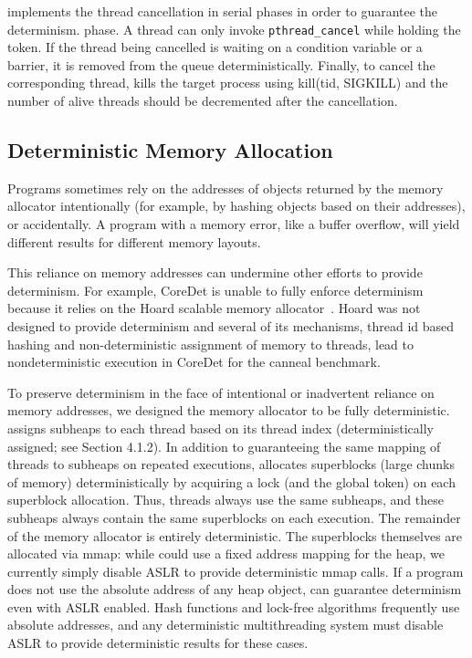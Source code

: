 \dthreads{} implements the thread cancellation in serial phases in order to guarantee the determinism. phase. A thread can only invoke \texttt{pthread\_cancel} while holding the token. If the thread being cancelled is waiting on a condition variable or a barrier, it is removed from the queue deterministically. Finally, to cancel the corresponding thread, \dthreads{} kills the target process using kill(tid, SIGKILL) and the number of alive threads should be decremented after the cancellation.

\subsection{Deterministic Memory Allocation}
Programs sometimes rely on the addresses of objects returned by the memory allocator intentionally (for example, by hashing objects based on their addresses), or accidentally. A program with a memory error, like a buffer overflow, will yield different results for different memory layouts.

This reliance on memory addresses can undermine other efforts to provide determinism. For example, CoreDet is unable to fully enforce determinism because it relies on the Hoard scalable memory allocator~\cite{Bergan:2010:CCR:1736020.1736029}. Hoard was not designed to provide determinism and several of its mechanisms, thread id based hashing and non-deterministic assignment of memory to threads, lead to nondeterministic execution in CoreDet for the canneal benchmark.


To preserve determinism in the face of intentional or inadvertent reliance on memory addresses, we designed the \dthreads{} memory allocator to be fully deterministic. \dthreads{} assigns subheaps to each thread based on its thread index (deterministically assigned; see Section 4.1.2). In addition to guaranteeing the same mapping of threads to subheaps on repeated executions, \dthreads{} allocates superblocks (large chunks of memory) deterministically
by acquiring a lock (and the global token) on each
superblock allocation. Thus, threads always use the same subheaps, and these subheaps always contain the same superblocks on each execution. The remainder of the memory allocator is entirely deterministic. The superblocks themselves are allocated via mmap: while \dthreads{} could use a fixed address mapping for the heap, we currently simply disable ASLR to provide deterministic mmap calls. If a program does not use the absolute address of any heap object, \dthreads{} can guarantee determinism even with ASLR enabled.
Hash functions and lock-free algorithms frequently use absolute addresses, and any deterministic multithreading system must disable ASLR to provide deterministic results for these cases.


